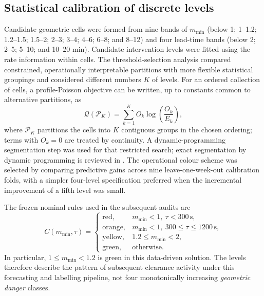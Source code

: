 \documentclass[aerospace,article,submit,moreauthors]{Definitions/mdpi}
\newcommand{\mmin}{m_{\min}}
\begin{document}
\subsection{Statistical calibration of discrete levels}\label{sec:colors}
Candidate geometric cells were formed from nine bands of $\mmin$ (below 1; 1--1.2; 1.2--1.5; 1.5--2; 2--3; 3--4; 4--6; 6--8; and 8--12) and four lead-time bands (below 2; 2--5; 5--10; and 10--20 min). Candidate intervention levels were fitted using the rate information within cells. The threshold-selection analysis compared constrained, operationally interpretable partitions with more flexible statistical groupings and considered different numbers $K$ of levels. For an ordered collection of cells, a profile-Poisson objective can be written, up to constants common to alternative partitions, as
\begin{equation}\label{eq:partition}
 \mathcal{Q}(\mathcal{P}_K)=\sum_{k=1}^{K}O_k\log\!\left(\frac{O_k}{E_k}\right),
\end{equation}
where $\mathcal{P}_K$ partitions the cells into $K$ contiguous groups in the chosen ordering; terms with $O_k=0$ are treated by continuity. A dynamic-programming segmentation step was used for that restricted search; exact segmentation by dynamic programming is reviewed in \cite{killick2012}. The operational colour scheme was selected by comparing predictive gains across nine leave-one-week-out calibration folds, with a simpler four-level specification preferred when the incremental improvement of a fifth level was small.

The frozen nominal rules used in the subsequent audits are
\begin{equation}\label{eq:color}
 C(\mmin,\tau)=
 \begin{cases}
 \mathrm{red},& \mmin<1,\ \tau<300\,\mathrm{s},\\
 \mathrm{orange},& \mmin<1,\ 300\le\tau\le1200\,\mathrm{s},\\
 \mathrm{yellow},&1.2\le\mmin<2,\\
 \mathrm{green},&\text{otherwise}.
 \end{cases}
\end{equation}
In particular, $1\le\mmin<1.2$ is green in this data-driven solution. The levels therefore describe the pattern of subsequent clearance activity under this forecasting and labelling pipeline, not four monotonically increasing \emph{geometric danger} classes.
\end{document}
